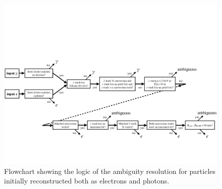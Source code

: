 \documentclass[a4paper, oneside, 11pt, openright]{book}
\begin{document}
		\begin{figure}
			\centering
			\includegraphics[width=.6\textheight]{tesi_images/el_ph_analisi.png}
			\caption{Flowchart showing the logic of the ambiguity resolution for particles initially reconstructed both as electrons and photons.}
			\label{fig:el_ph_analisi}
		\end{figure}
\end{document}
